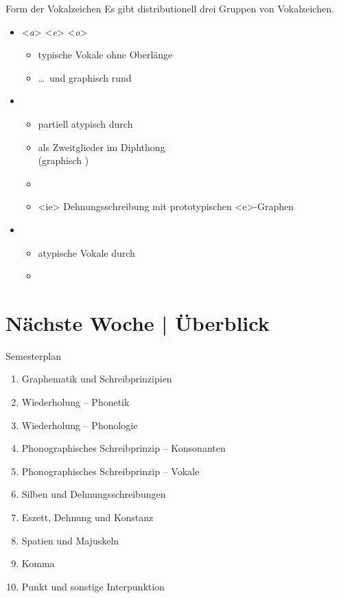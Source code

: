 \begin{frame}
  {Form der Vokalzeichen}
  \onslide<+->
  \onslide<+->
  Es gibt distributionell drei Gruppen von Vokalzeichen.\\
  \Zeile
  \begin{itemize}[<+->]
    \item \alert{<\textit{a}> <\textit{e}> <\textit{o}>}
      \begin{itemize}[<+->]
        \item typische Vokale \alert{ohne Oberlänge}
        \item \ldots\ und \alert{graphisch rund}
      \end{itemize}
      \Halbzeile
    \item {}
      \begin{itemize}[<+->]
        \item partiell atypisch durch 
        \item als Zweitglieder im Diphthong \\
          (graphisch )
        \item {}
        \item{} <ie> Dehnungsschreibung mit prototypischen <e>-Graphen
      \end{itemize}
      \Halbzeile
    \item {}
      \begin{itemize}[<+->]
        \item atypische Vokale durch 
        \item {}
      \end{itemize}
  \end{itemize}
\end{frame}

\ifdefined\TITLE
  \section{Nächste Woche | Überblick}

  \begin{frame}
    {Semesterplan}
    \begin{enumerate}
      \item Graphematik und Schreibprinzipien
      \item Wiederholung -- Phonetik
      \item Wiederholung -- Phonologie
      \item Phonographisches Schreibprinzip -- Konsonanten
      \item Phonographisches Schreibprinzip -- Vokale
      \item \alert{Silben und Dehnungsschreibungen}
      \item Eszett, Dehnung und Konstanz
      \item Spatien und Majuskeln
      \item Komma
      \item Punkt und sonstige Interpunktion
    \end{enumerate}
  \end{frame}
\fi
